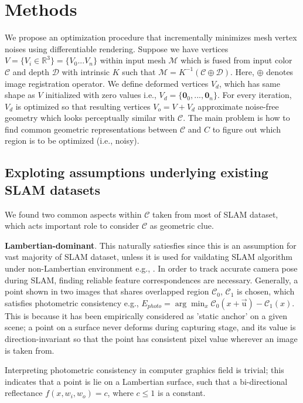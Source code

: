 \section{Methods}

We propose an optimization procedure that incrementally minimizes mesh vertex noises using differentiable rendering. 
Suppose we have vertices $V=\{V_i\in\mathbb{R}^3\}=\{V_0...V_n\}$ within input mesh $\mathcal{M}$ which is fused from input color $\mathcal{C}$ and depth $\mathcal{D}$ with intrinsic $K$ such that $\mathcal{M}=K^{-1}\left(\mathcal{C}\oplus \mathcal{D}\right)$. 
Here, $\oplus$ denotes image registration operator.
We define deformed vertices $V_d$, which has same shape as $V$ initialized with zero values i.e., $V_d=\{\mathbf{0}_0,...,\mathbf{0}_n\}$. 
For every iteration, $V_d$ is optimized so that resulting vertices $V_o=V+V_d$ approximate noise-free geometry which looks perceptually similar with $\mathcal{C}$. 
The main problem is how to find common geometric representations between $\mathcal{C}$ and $C$ to figure out which region is to be optimized (i.e., noisy). 

\subsection{Exploting assumptions underlying existing SLAM datasets}
We found two common aspects within $\mathcal{C}$ taken from most of SLAM dataset, which acts important role to consider $\mathcal{C}$ as geometric clue.

\noindent \textbf{Lambertian-dominant}. 
This naturally satiesfies since this is an assumption for vast majority of SLAM dataset, unless it is used for vaildating SLAM algorithm under non-Lambertian environment e.g., \cite{whelan2018reconstructing}. 
In order to track accurate camera pose during SLAM, finding reliable feature correspondences are necessary.
Generally, a point shown in two images that shares overlapped region $\mathcal{C}_0$, $\mathcal{C}_1$ is chosen, which satisfies photometric consistency e.g., $E_{photo}=\arg\min_x \mathcal{C}_0\left(x+\overrightarrow{\mathrm{u}}\right)-\mathcal{C}_1\left(x\right)$. \cite{szeliski2010computer}
This is because it has been empirically considered as 'static anchor' on a given scene; a point on a surface never deforms during capturing stage, and its value is direction-invariant so that the point has consistent pixel value wherever an image is taken from. 

Interpreting photometric consistency in computer graphics field is trivial; this indicates that a point is lie on a Lambertian surface, such that a bi-directional reflectance $f(x, w_i, w_o)=c$, where $c\le 1$ is a constant.


